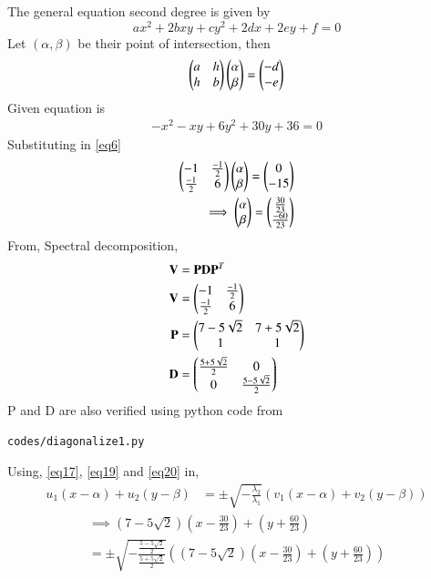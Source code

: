 \documentclass[journal,12pt,twocolumn]{IEEEtran}
\begin{document}
The general equation second degree is given by
\begin{equation}\label{eq5}
	ax^2 + 2bxy + cy^2 + 2dx + 2ey + f = 0
\end{equation}
Let $(\alpha,\beta)$ be their point of intersection, then
\begin{equation}\label{eq6}
	\begin{pmatrix} a & h\\ h & b\end{pmatrix}\begin{pmatrix}\alpha \\ \beta\end{pmatrix} = \begin{pmatrix}-d \\ -e\end{pmatrix}
\end{equation}
Given equation is
\begin{align}
	-x^2-xy+6y^2+30y+36=0
\end{align}
Substituting in \eqref{eq6}
\begin{align}
	\label{eq16}\begin{pmatrix} -1 & \frac{-1}{2}\\\frac{-1}{2} & 6\end{pmatrix}\begin{pmatrix}\alpha \\ \beta\end{pmatrix} = \begin{pmatrix}0 \\ -15\end{pmatrix} \\
	\label{eq17}\implies \begin{pmatrix}\alpha \\ \beta\end{pmatrix} = \begin{pmatrix}\frac{30}{23} \\ \frac{-60}{23}\end{pmatrix}
\end{align}
From, Spectral decomposition,
\begin{align}
	\mathbf{V} &= \mathbf{P}\mathbf{D}\mathbf{P}^T\\
	\label{eq18}\mathbf{V} &= \begin{pmatrix} -1 & \frac{-1}{2}\\\frac{-1}{2} & 6\end{pmatrix}\\
	\label{eq19}\mathbf{P} &= \begin{pmatrix}7-5 \sqrt{2} & 7+5 \sqrt{2}\\ 1 & 1\end{pmatrix}\\
	\label{eq20}\mathbf{D} &= \begin{pmatrix}\frac{5+5\sqrt{2}}{2} & 0\\ 0 & \frac{5-5\sqrt{2}}{2}\end{pmatrix}
\end{align}
P and D are also verified using python code from
\begin{lstlisting}
codes/diagonalize1.py
\end{lstlisting}
Using, \eqref{eq17}, \eqref{eq19} and \eqref{eq20} in,
\begin{align}
	u_1(x-\alpha) + u_2(y-\beta) &= \pm \sqrt{-\frac{\lambda_2}{\lambda_1}}(v_1(x-\alpha) + v_2(y-\beta))\label{eq14}
\end{align}
\begin{multline}\label{eq21}
\implies	\left(7-5 \sqrt{2}\right)\left(x-\frac{30}{23}\right) + \left(y+\frac{60}{23}\right) \\= \pm \sqrt{-\frac{\frac{5-5\sqrt{2}}{2}}{\frac{5+5\sqrt{2}}{2}}}\left(\left(7-5 \sqrt{2}\right)\left(x-\frac{30}{23}\right) + \left(y+\frac{60}{23}\right)\right)
\end{multline}
\end{document}
